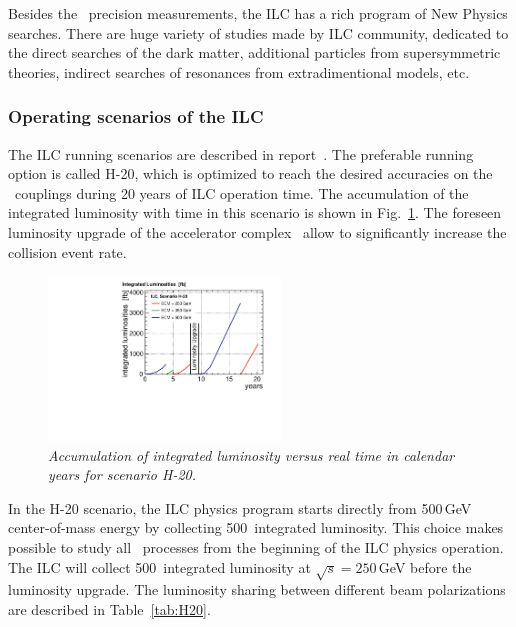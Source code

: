 
Besides the \sm\ precision measurements, the ILC has a rich program of New Physics searches. 
There are huge variety of studies made by ILC community, dedicated to the direct searches of the dark matter, additional particles from supersymmetric theories, indirect searches of resonances from extradimentional models, etc.

\subsubsection{Operating scenarios of the ILC}
\label{sec:ILCOperation}
The ILC running scenarios are described in report~\cite{bib:H20}. 
The preferable running option is called H-20, which is optimized to reach the desired accuracies on the \sm\ couplings during 20 years of ILC operation time. 
The accumulation of the integrated luminosity with time in this scenario is shown in Fig.~\ref{fig:H20}.
The foreseen luminosity upgrade of the accelerator complex~\cite{bib:LumiUp} allow to significantly increase the collision event rate. 

\begin{figure}
	{\centering
		\includegraphics[width=0.55\textwidth]{graphics/lumi_H-20.pdf}
		\caption{\sl Accumulation of integrated luminosity versus real time in calendar years for scenario H-20.}
		\label{fig:H20}
	}
\end{figure}
In the H-20 scenario, the ILC physics program starts directly from 500\,GeV center-of-mass energy by collecting 500\ifb\ integrated luminosity. This choice makes possible to study all \sm\ processes from the beginning of the ILC physics operation.
The ILC will collect 500\ifb\ integrated luminosity at $\sqrt{s} = 250$\,GeV before the luminosity upgrade.
The luminosity sharing between different beam polarizations are described in Table~\ref{tab:H20}. 

